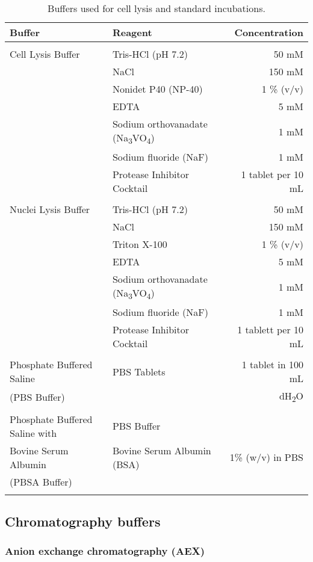 \begin{table}[H]
\begin{tabular}{l l r}
\textbf{Buffer} & \textbf{Reagent} & \textbf{Concentration}\\
\hline
\\
Cell Lysis Buffer & Tris-HCl (pH 7.2) & 50 mM\\ & NaCl & 150 mM \\ & Nonidet P40 (NP-40) & 1 \% (v/v) \\ & EDTA & 5 mM\\ & Sodium orthovanadate (Na\textsubscript{3}VO\textsubscript{4}) & 1 mM\\ & Sodium fluoride (NaF) & 1 mM\\ & Protease Inhibitor Cocktail & 1 tablet per 10 mL \\  
\\
Nuclei Lysis Buffer & Tris-HCl (pH 7.2) & 50 mM\\ & NaCl & 150 mM\\ & Triton X-100 & 1 \% (v/v)\\ & EDTA & 5 mM\\ & Sodium orthovanadate (Na\textsubscript{3}VO\textsubscript{4}) & 1 mM\\ & Sodium fluoride (NaF) & 1 mM\\ & Protease Inhibitor Cocktail & 1 tablett per 10 mL\\
\\ 
Phosphate Buffered Saline & PBS Tablets & 1 tablet in 100 mL \\ 
(PBS Buffer) & & dH\textsubscript{2}O\\
\\
Phosphate Buffered Saline with & PBS Buffer & \\
Bovine Serum Albumin & Bovine Serum Albumin (BSA) & 1\% (w/v) in PBS \\
(PBSA Buffer) & & \\
\\

\end{tabular}

\caption[General buffers]{Buffers used for cell lysis and standard incubations.}
\label{General buffers}
\end{table}

\subsection{Chromatography buffers}
\subsubsection{Anion exchange chromatography (AEX)}

